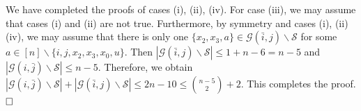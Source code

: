 \documentclass[11pt]{article}
\numberwithin{equation}{section}
\begin{document}
We have completed the proofs of cases (i), (ii), (iv).
For case (iii), we may assume that cases (i) and (ii) are not true.
Furthermore, by symmetry and cases (i), (ii) (iv), we may assume that there is only one
$\{x_2, x_3, a\}\in \mathcal{G}(\bar{i},j)\backslash\mathcal{S}$ for some $a\in [n]\backslash\{i, j, x_2,x_3,x_0, u\}$.
Then $|\mathcal{G}(\bar{i},j)\backslash\mathcal{S}|\leq 1+n-6=n-5$ and $|\mathcal{G}(i,\bar{j})\backslash\mathcal{S}|\leq n-5$.
Therefore, we obtain $|\mathcal{G}(i,\bar{j})\backslash\mathcal{S}|+|\mathcal{G}(\bar{i},j)\backslash\mathcal{S}|\leq 2n-10\leq \binom{n-5}{2}+2$.
This completes the proof.$\hfill \square$
\end{document}
